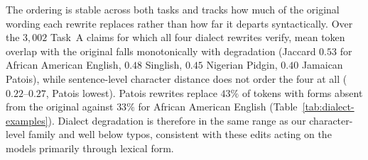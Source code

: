 The ordering is stable across both tasks and tracks how much of the
original wording each rewrite replaces rather than how far it departs
syntactically. Over the $3{,}002$ Task~A claims for which all four
dialect rewrites verify, mean token overlap with the original falls
monotonically with degradation (Jaccard $0.53$ for African American
English, $0.48$ Singlish, $0.45$ Nigerian Pidgin, $0.40$ Jamaican
Patois), while sentence-level character distance does not order the four
at all ($0.22$--$0.27$, Patois lowest). Patois rewrites replace $43\%$ of
tokens with forms absent from the original against $33\%$ for African
American English (Table~\ref{tab:dialect-examples}). Dialect degradation
is therefore in the same range as our character-level family and well
below typos, consistent with these edits acting on the models primarily
through lexical form.



%
%
%
%
%
